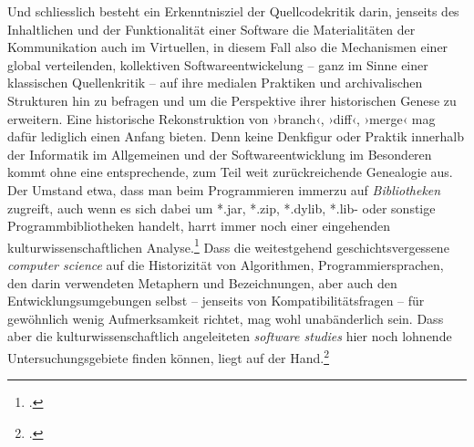 \documentclass[a4paper,11pt]{article}
\newcommand{\inanf}[1]{›#1‹}
\begin{document}
Und schliesslich besteht ein Erkenntnisziel der Quellcodekritik darin, jenseits des Inhaltlichen und der Funktionalität einer Software die Materialitäten der Kommunikation auch im Virtuellen, in diesem Fall also die Mechanismen einer global verteilenden, kollektiven Softwareentwickelung – ganz im Sinne einer klassischen Quellenkritik – auf ihre medialen Praktiken und archivalischen Strukturen hin zu befragen und um die Perspektive ihrer historischen Genese zu erweitern. Eine historische Rekonstruktion von \inanf{branch}, \inanf{diff}, \inanf{merge} mag dafür lediglich einen Anfang bieten. Denn keine Denkfigur oder Praktik innerhalb der Informatik im Allgemeinen und der Softwareentwicklung im Besonderen kommt ohne eine entsprechende, zum Teil weit zurückreichende Genealogie aus. Der Umstand etwa, dass man beim Programmieren immerzu auf \emph{Bibliotheken} zugreift, auch wenn es sich dabei um *.jar, *.zip, *.dylib, *.lib- oder sonstige Programmbibliotheken handelt, harrt immer noch einer eingehenden kulturwissenschaftlichen Analyse.\footcite[Einen eher künstlerischen Anatz, die Leistungen einer Programmbibliothek zu reflektieren, findet sich bei][weitergehende, die Metaphorik von \inanf{Bibliothek} und dem gesamten \inanf{Bibiliothekswesen} kritisch analysierende Untersuchungen, die Reichweite, Passgenauigkeit und Erkenntnisgewinn eines solchen semantischen Feldes im Bereich der Softwareentwicklung bilanzierten,  sind im Moment noch ein Desiderat.]{harwood:2008} Dass die weitestgehend geschichtsvergessene \emph{computer science} auf die Historizität von Algorithmen, Programmiersprachen, den darin verwendeten Metaphern und Bezeichnungen, aber auch den Entwicklungsumgebungen selbst – jenseits von Kompatibilitätsfragen – für gewöhnlich wenig Aufmerksamkeit richtet, mag wohl unabänderlich sein. Dass aber die kulturwissenschaftlich angeleiteten \emph{software studies} hier noch lohnende Untersuchungsgebiete finden können, liegt auf der Hand.\footcite[Vgl. als frühen produktiven Ansatz][]{hagen:1997}
  
\end{document}
